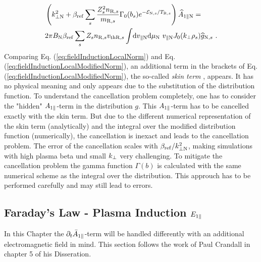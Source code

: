 \begin{gather}
    \begin{aligned}
        &\left(k_{\perp \mathrm{N}}^2 + \beta_\mathrm{ref} \sum_s \frac{Z^2_sn_{\mathrm{R},s}}{m_{\mathrm{R},s}} \Gamma_0(b_s) e^{-\mathcal{E}_{\mathrm{N},s}/T_{\mathrm{R},s}} \right) \widehat{A}_{1\parallel \mathrm{N}} = \\
        & 2\pi B_\mathrm{N} \beta_\mathrm{ref} \sum_s Z_s n_{\mathrm{R},s} v_{\mathrm{th}\mathrm{R},s} \int \! \mathrm{d}v_{\parallel \mathrm{N}} \mathrm{d}\mu_\mathrm{N} ~ v_{\parallel \mathrm{N}} J_0(k_\perp \rho_s) \widehat{g}_{\mathrm{N},s} ~.
    \end{aligned}
    \label{eq:fieldInductionLocalModifiedNorm}
\end{gather}
Comparing Eq. (\ref{eq:fieldInductionLocalNorm}) and Eq. (\ref{eq:fieldInductionLocalModifiedNorm}), an additional term in the brackets of Eq. (\ref{eq:fieldInductionLocalModifiedNorm}), the so-called \textit{skin term} \cite{Mishchenko2017}, appears. It has no physical meaning and only appears due to the substitution of the distribution function. To understand the cancellation problem completely, one has to consider the "hidden" $A_{1\parallel}$-term in the distribution $g$. This $A_{1\parallel}$-term has to be cancelled exactly with the skin term. But due to the different numerical representation of the skin term (analytically) and the integral over the modified distribution function (numerically), the cancellation is inexact and leads to the cancellation problem. The error of the cancellation scales with $\beta_\mathrm{ref}/k_{\perp \mathrm{N}}^2$, making simulations with high plasma beta und small $k_\perp$ very challenging. \cite{Naitou1995} To mitigate the cancellation problem the gamma function $\Gamma(b)$ is calculated with the same numerical scheme as the integral over the distribution. This approuch has to be performed carefully and may still lead to errors.
\newpage

\subsection{Faraday's Law - Plasma Induction $E_{1\parallel}$}
\label{sub:fieldEpar}

In this Chapter the $\partial_t \bar{A}_{1\parallel}$-term will be handled differently with an additional electromagnetic field in mind. This section follows the work of Paul Crandall in chapter 5 of his Disseration\cite{Crandall_PHD}.
\bigskip

